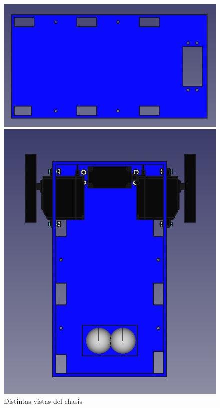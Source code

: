 \begin{figure}[ht!]
	\centering
	\begin{minipage}{0.45\linewidth}
		\centering
		\includegraphics[width=\linewidth]{figs/cap5/basevistasuperiorsin.png}
	\end{minipage}
	\hspace{1cm}
	\begin{minipage}{0.45\linewidth}
		\centering
		\includegraphics[angle=270, width=\linewidth]{figs/cap5/basecon2.png}
	\end{minipage}
	\caption{Distintas vistas del chasis}
	\label{fig:pbase}
\end{figure}

